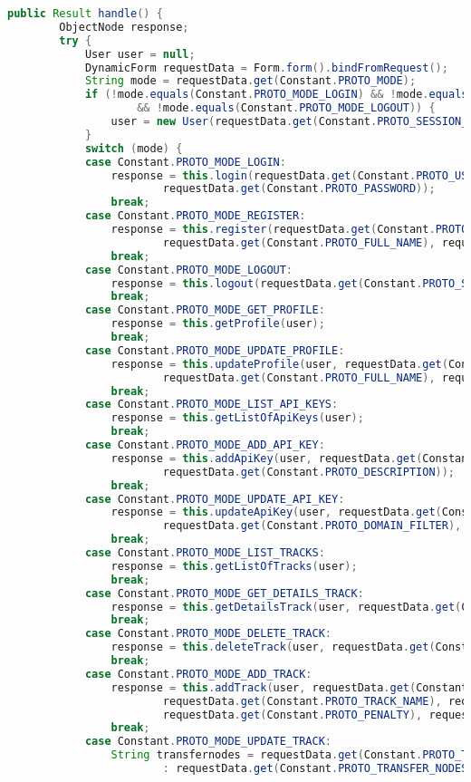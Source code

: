 \begin{lstlisting}[language=Java,basicstyle=\tiny,caption=controllers/Application.java,label={lst:application.java}]
	public Result handle() {
		ObjectNode response;
		try {
			User user = null;
			DynamicForm requestData = Form.form().bindFromRequest();
			String mode = requestData.get(Constant.PROTO_MODE);
			if (!mode.equals(Constant.PROTO_MODE_LOGIN) && !mode.equals(Constant.PROTO_MODE_REGISTER)
					&& !mode.equals(Constant.PROTO_MODE_LOGOUT)) {
				user = new User(requestData.get(Constant.PROTO_SESSION_ID));
			}
			switch (mode) {
			case Constant.PROTO_MODE_LOGIN:
				response = this.login(requestData.get(Constant.PROTO_USER_ID),
						requestData.get(Constant.PROTO_PASSWORD));
				break;
			case Constant.PROTO_MODE_REGISTER:
				response = this.register(requestData.get(Constant.PROTO_USER_ID),
						requestData.get(Constant.PROTO_FULL_NAME), requestData.get(Constant.PROTO_COMPANY));
				break;
			case Constant.PROTO_MODE_LOGOUT:
				response = this.logout(requestData.get(Constant.PROTO_SESSION_ID));
				break;
			case Constant.PROTO_MODE_GET_PROFILE:
				response = this.getProfile(user);
				break;
			case Constant.PROTO_MODE_UPDATE_PROFILE:
				response = this.updateProfile(user, requestData.get(Constant.PROTO_PASSWORD),
						requestData.get(Constant.PROTO_FULL_NAME), requestData.get(Constant.PROTO_COMPANY));
				break;
			case Constant.PROTO_MODE_LIST_API_KEYS:
				response = this.getListOfApiKeys(user);
				break;
			case Constant.PROTO_MODE_ADD_API_KEY:
				response = this.addApiKey(user, requestData.get(Constant.PROTO_DOMAIN_FILTER),
						requestData.get(Constant.PROTO_DESCRIPTION));
				break;
			case Constant.PROTO_MODE_UPDATE_API_KEY:
				response = this.updateApiKey(user, requestData.get(Constant.PROTO_VERIFIER),
						requestData.get(Constant.PROTO_DOMAIN_FILTER), requestData.get(Constant.PROTO_DESCRIPTION));
				break;
			case Constant.PROTO_MODE_LIST_TRACKS:
				response = this.getListOfTracks(user);
				break;
			case Constant.PROTO_MODE_GET_DETAILS_TRACK:
				response = this.getDetailsTrack(user, requestData.get(Constant.PROTO_TRACK_ID));
				break;
			case Constant.PROTO_MODE_DELETE_TRACK:
				response = this.deleteTrack(user, requestData.get(Constant.PROTO_TRACK_ID));
				break;
			case Constant.PROTO_MODE_ADD_TRACK:
				response = this.addTrack(user, requestData.get(Constant.PROTO_TRACK_ID),
						requestData.get(Constant.PROTO_TRACK_NAME), requestData.get(Constant.PROTO_TRACK_TYPE),
						requestData.get(Constant.PROTO_PENALTY), requestData.get(Constant.PROTO_INTERNAL_INFO));
				break;
			case Constant.PROTO_MODE_UPDATE_TRACK:
				String transfernodes = requestData.get(Constant.PROTO_TRANSFER_NODES) == null ? ""
						: requestData.get(Constant.PROTO_TRANSFER_NODES);

\end{lstlisting}
